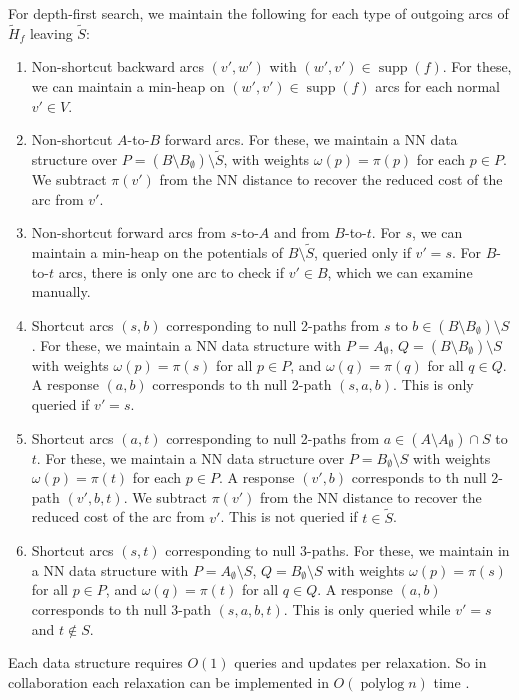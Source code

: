 \documentclass[a4paper,UKenglish]{socg-lipics-v2018}
\def\polylog{\mathop{\mathrm{polylog}}}
\def\supp{\operatorname{supp}}
\theoremstyle{plain}
\numberwithin{figure}{section}
\begin{document}
\begin{toappendix}

For depth-first search, we maintain the following for each type of outgoing arcs of $\tilde{H}_f$ leaving $\tilde{S}$:
%
\begin{enumerate}
\item Non-shortcut backward arcs $(v', w')$ with $(w', v') \in \supp(f)$.
	For these, we can maintain a min-heap on $(w', v') \in \supp(f)$ arcs
	for each normal $v' \in V$.
\item Non-shortcut $A$-to-$B$ forward arcs.
	For these, we maintain a NN data structure over
	$P = (B \setminus B_\emptyset) \setminus \tilde{S}$, with weights
	$\omega(p) = \pi(p)$ for each $p \in P$.
	We subtract $\pi(v')$ from the NN distance to recover the reduced cost
	of the arc from $v'$.
\item Non-shortcut forward arcs from $s$-to-$A$ and from $B$-to-$t$.
	For $s$, we can maintain a min-heap on the potentials of
	$B \setminus \tilde{S}$, queried only if $v' = s$.
	For $B$-to-$t$ arcs, there is only one arc to check if $v' \in B$,
	which we can examine manually.

\item Shortcut arcs $(s, b)$ corresponding to null 2-paths from $s$ to
	$b \in (B \setminus B_\emptyset) \setminus S$.
	For these, we maintain a NN data structure with $P = A_\emptyset$,
	$Q = (B \setminus B_\emptyset) \setminus S$ with weights
	$\omega(p) = \pi(s)$ for all $p \in P$, and $\omega(q) = \pi(q)$ for
	all $q \in Q$.
	A response $(a, b)$ corresponds to th null 2-path $(s, a, b)$.
	This is only queried if $v' = s$.
\item Shortcut arcs $(a, t)$ corresponding to null 2-paths from
	$a \in (A \setminus A_\emptyset) \cap S$ to $t$.
	For these, we maintain a NN data structure over
	$P = B_\emptyset \setminus S$ with weights $\omega(p) = \pi(t)$ for
	each $p \in P$.
	A response $(v', b)$ corresponds to th null 2-path $(v', b, t)$.
	We subtract $\pi(v')$ from the NN distance to recover the reduced cost
	of the arc from $v'$.
	This is not queried if $t \in \tilde{S}$.
\item Shortcut arcs $(s, t)$ corresponding to null 3-paths.
	For these, we maintain in a NN data structure with
	$P = A_\emptyset \setminus S$, $Q = B_\emptyset \setminus S$ with
	weights $\omega(p) = \pi(s)$ for all
	$p \in P$, and $\omega(q) = \pi(t)$ for all $q \in Q$.
	A response $(a, b)$ corresponds to th null 3-path $(s, a, b, t)$.
	This is only queried while $v' = s$ and $t \not\in S$.
\end{enumerate}

\end{toappendix}
%
Each data structure requires $O(1)$ queries and updates per relaxation.
So in collaboration each relaxation can be implemented in $O(\polylog n)$ time
\cite{KMRSS17}.
\end{document}
